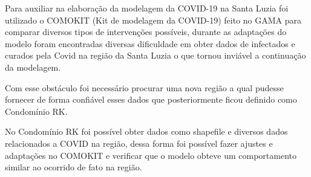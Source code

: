 Para auxiliar na elaboração da modelagem da COVID-19 na Santa Luzia foi utilizado o COMOKIT (Kit de modelagem da COVID-19) feito no GAMA para comparar diversos tipos de intervenções possíveis, durante as adaptações do modelo foram encontradas diversas dificuldade em obter dados de infectados e curados pela Covid na região da Santa Luzia o que tornou inviável a continuação da modelagem.

Com esse obstáculo foi necessário procurar uma nova região a qual pudesse fornecer de forma confiável esses dados que posteriormente ficou definido como Condomínio RK.

No Condomínio RK foi possível obter dados como shapefile e diversos dados relacionados a COVID na região, dessa forma foi possível fazer ajustes e adaptações no COMOKIT e verificar que o modelo obteve um comportamento similar ao ocorrido de fato na região.






